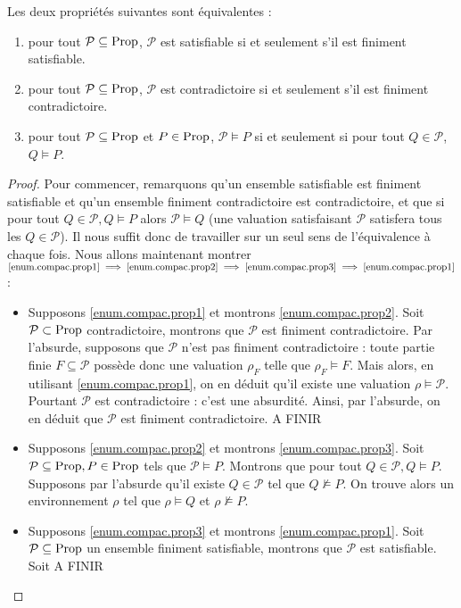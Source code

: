 \begin{proposition}
  Les deux propriétés suivantes sont équivalentes :
  \begin{enumerate}[label=(\roman*)]
  \item\label{enum.compac.prop1} pour tout $\mathcal P\subseteq \operatorname{Prop}$,
    $\mathcal P$ est satisfiable si et seulement s'il est finiment satisfiable.
  \item\label{enum.compac.prop2} pour tout $\mathcal P\subseteq\operatorname{Prop}$,
    $\mathcal P$ est contradictoire si et seulement s'il est finiment
    contradictoire.
  \item\label{enum.compac.prop3} pour tout $\mathcal P\subseteq\operatorname{Prop}$ et
    $P\in\operatorname{Prop}$, $\mathcal P\vDash P$ si et seulement si pour tout
    $Q\in\mathcal P$, $Q\vDash P$.
  \end{enumerate}
\end{proposition}

\begin{proof}
  Pour commencer, remarquons qu'un ensemble satisfiable est finiment satisfiable
  et qu'un ensemble finiment contradictoire est contradictoire, et que si pour
  tout $Q\in\mathcal P, Q\vDash P$ alors $\mathcal P\vDash Q$ (une valuation
  satisfaisant $\mathcal P$ satisfera tous les $Q\in\mathcal P$). Il nous suffit
  donc de travailler sur un seul sens de l'équivalence à chaque fois. Nous allons
  maintenant montrer
  $\ref{enum.compac.prop1}\implies\ref{enum.compac.prop2}\implies
  \ref{enum.compac.prop3}\implies\ref{enum.compac.prop1}$ :
  \begin{itemize}
  \item Supposons \ref{enum.compac.prop1} et montrons \ref{enum.compac.prop2}.
    Soit $\mathcal P\subset \operatorname{Prop}$ contradictoire, montrons que $\mathcal P$
    est finiment contradictoire. Par l'absurde, supposons que $\mathcal P$ n'est
    pas finiment contradictoire : toute partie finie $F\subseteq \mathcal P$
    possède donc une valuation $\rho_F$ telle que $\rho_F\models F$. Mais alors,
    en utilisant \ref{enum.compac.prop1}, on en déduit qu'il existe une valuation
    $\rho\models \mathcal P$. Pourtant $\mathcal P$ est contradictoire : c'est
    une absurdité. Ainsi, par l'absurde, on en déduit que $\mathcal P$ est
    finiment contradictoire. A FINIR
  \item Supposons \ref{enum.compac.prop2} et montrons \ref{enum.compac.prop3}.
    Soit $\mathcal P\subseteq\operatorname{Prop}, P\in\operatorname{Prop}$ tels que $\mathcal P\vDash P$.
    Montrons que pour tout $Q\in\mathcal P,Q\vDash P$. Supposons par l'absurde
    qu'il existe $Q\in\mathcal P$ tel que $Q\not\vDash P$. On trouve alors un
    environnement $\rho$ tel que $\rho\models Q$ et $\rho\not\models P$.
  \item Supposons \ref{enum.compac.prop3} et montrons \ref{enum.compac.prop1}.
    Soit $\mathcal P\subseteq\operatorname{Prop}$ un ensemble finiment satisfiable, montrons
    que $\mathcal P$ est satisfiable. Soit A FINIR
  \end{itemize}
\end{proof}

